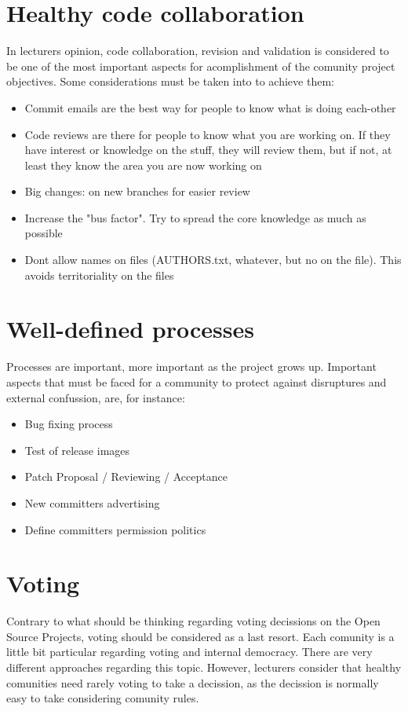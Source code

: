 \documentclass[11pt]{article}
\begin{document}
\section{Healthy code collaboration}
In lecturers opinion, code collaboration, revision and validation is considered to be one of the most important aspects for acomplishment of the comunity project objectives. Some considerations must be taken into to achieve them:
\begin{itemize}\itemsep0pt
\item{Commit emails are the best way for people to know what is doing each-other}
\item{Code reviews are there for people to know what you are working on. If they have interest or knowledge on the stuff, they will review them, but if not, at least they know the area you are now working on}
\item{Big changes: on new branches for easier review}
\item{Increase the "bus factor". Try to spread the core knowledge as much as possible}
\item{Dont allow names on files (AUTHORS.txt, whatever, but no on the file). This avoids territoriality on the files}
\end{itemize}

\section{Well-defined processes}
Processes are important, more important as the project grows up. Important aspects that must be faced for a community to protect against disruptures and external confussion, are, for instance:
\begin{itemize}\itemsep0pt
\item{Bug fixing process}
\item{Test of release images}
\item{Patch Proposal / Reviewing / Acceptance}
\item{New committers advertising}
\item{Define committers permission politics}
\end{itemize}

\section{Voting}
Contrary to what should be thinking regarding voting decissions on the Open Source Projects, voting should be considered as a last resort.
Each comunity is a little bit particular regarding voting and internal democracy. There are very different approaches regarding this topic. However, lecturers consider that healthy comunities need rarely voting to take a decission, as the decission is normally easy to take considering comunity rules.
\end{document}
